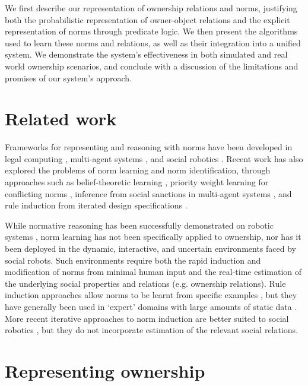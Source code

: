 \documentclass[letterpaper]{article} %
\begin{document}
We first describe our representation of ownership relations and norms, justifying both the probabilistic representation of owner-object relations and the explicit representation of norms through predicate logic. We then present the algorithms used to learn these norms and relations, as well as their integration into a unified system. We demonstrate the system's effectiveness in both simulated and real world ownership scenarios, and conclude with a discussion of the limitations and promises of our system's approach.

\section{Related work}

Frameworks for representing and reasoning with norms have been developed in legal computing \cite{hoekstra2007lkif,palmirani2011legalruleml,lam2016enabling}, multi-agent systems \cite{vasconcelos2009normative,savarimuthu2011norm}, and social robotics  \cite{malle2017networks}. Recent work has also explored the problems of norm learning and norm identification, through approaches such as belief-theoretic learning \cite{sarathy2017learning}, priority weight learning for conflicting norms \cite{kasenberg2018inverse}, inference from social sanctions in multi-agent systems \cite{savarimuthu2010obligation,cranefield2015bayesian}, and rule induction from iterated design specifications \cite{corapi2011normative}.

While normative reasoning has been successfully demonstrated on robotic systems \cite{galindo2012semantic,sarathy2016logic}, norm learning has not been specifically applied to ownership, nor has it been deployed in the dynamic, interactive, and uncertain environments faced by social robots. Such environments require both the rapid induction and modification of norms from minimal human input and the real-time estimation of the underlying social properties and relations (e.g. ownership relations). Rule induction approaches allow norms to be learnt from specific examples \cite{furnkranz1999separate,ruckert2008statistical}, but they have generally been used in `expert' domains with large amounts of static data \cite{langley1995applications,maloof2003incremental}. More recent iterative approaches to norm induction are better suited to social robotics \cite{corapi2011normative}, but they do not incorporate estimation of the relevant social relations.

\section{Representing ownership}
\end{document}
